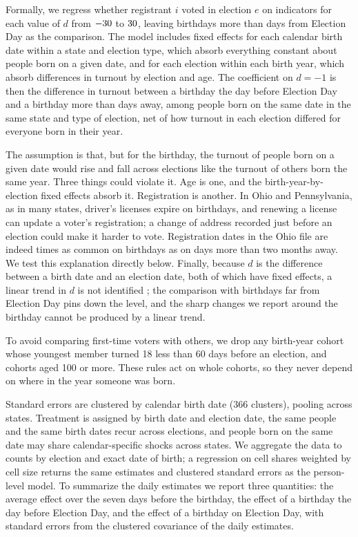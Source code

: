 \documentclass[11pt]{article}
\begin{document}
Formally, we regress whether registrant $i$ voted in election $e$ on indicators for each value of $d$ from $-30{}$ to $30{}$, leaving birthdays more than \window{} days from Election Day as the comparison. The model includes fixed effects for each calendar birth date within a state and election type, which absorb everything constant about people born on a given date, and for each election within each birth year, which absorb differences in turnout by election and age. The coefficient on $d = -1$ is then the difference in turnout between a birthday the day before Election Day and a birthday more than \window{} days away, among people born on the same date in the same state and type of election, net of how turnout in each election differed for everyone born in their year.

The assumption is that, but for the birthday, the turnout of people born on a given date would rise and fall across elections like the turnout of others born the same year. Three things could violate it. Age is one, and the birth-year-by-election fixed effects absorb it. Registration is another. In Ohio and Pennsylvania, as in many states, driver's licenses expire on birthdays, and renewing a license can update a voter's registration; a change of address recorded just before an election could make it harder to vote. Registration dates in the Ohio file are indeed \registrationRatio{} times as common on birthdays as on days more than two months away. We test this explanation directly below. Finally, because $d$ is the difference between a birth date and an election date, both of which have fixed effects, a linear trend in $d$ is not identified \citep{borusyak2024revisiting}; the comparison with birthdays far from Election Day pins down the level, and the sharp changes we report around the birthday cannot be produced by a linear trend.

To avoid comparing first-time voters with others, we drop any birth-year cohort whose youngest member turned 18 less than 60 days before an election, and cohorts aged 100 or more. These rules act on whole cohorts, so they never depend on where in the year someone was born.

Standard errors are clustered by calendar birth date (366 clusters), pooling across states. Treatment is assigned by birth date and election date, the same people and the same birth dates recur across elections, and people born on the same date may share calendar-specific shocks across states. We aggregate the data to counts by election and exact date of birth; a regression on cell shares weighted by cell size returns the same estimates and clustered standard errors as the person-level model. To summarize the daily estimates we report three quantities: the average effect over the seven days before the birthday, the effect of a birthday the day before Election Day, and the effect of a birthday on Election Day, with standard errors from the clustered covariance of the daily estimates.
\end{document}
